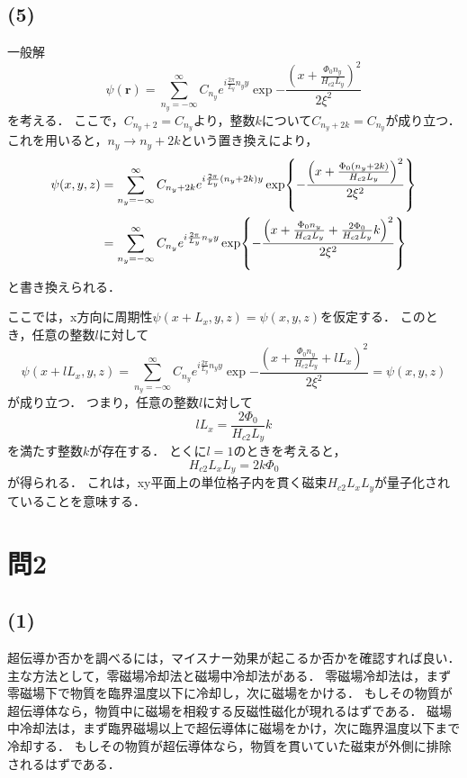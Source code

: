 \documentclass[a4paper,11pt]{jsarticle}
\begin{document}
\subsection*{(5)}
一般解
\begin{equation}
  \psi(\bm{r}) = \sum_{n_y=-\infty}^{\infty} C_{n_y} e^{i\frac{2\pi}{L_y}n_yy}\exp{-\frac{\left(x+\frac{\Phi_0n_y}{H_{c2}L_y}\right)^2}{2\xi^2}}
\end{equation}
を考える．
ここで，$C_{n_y+2}=C_{n_y}$より，整数$k$について$C_{n_y+2k}=C_{n_y}$が成り立つ．
これを用いると，$n_y\to n_y+2k$という置き換えにより，
\begin{align}
  \psi(x,y,z) 
  &= \sum_{n_y=-\infty}^{\infty} C_{n_y+2k} e^{i\frac{2\pi}{L_y}(n_y+2k)y}\exp{-\frac{\left(x+\frac{\Phi_0(n_y+2k)}{H_{c2}L_y}\right)^2}{2\xi^2}} \notag\\
  &= \sum_{n_y=-\infty}^{\infty} C_{n_y} e^{i\frac{2\pi}{L_y}n_yy}\exp{-\frac{\left(x+\frac{\Phi_0n_y}{H_{c2}L_y} + \frac{2\Phi_0}{H_{c2}L_y}k \right)^2}{2\xi^2}}
\end{align}
と書き換えられる．

ここでは，x方向に周期性$\psi(x+L_x,y,z) = \psi(x,y,z)$を仮定する．
このとき，任意の整数$l$に対して
\begin{equation}
  \psi(x+lL_x,y,z) = \sum_{n_y=-\infty}^{\infty} C_{n_y} e^{i\frac{2\pi}{L_y}n_yy}\exp{-\frac{\left(x+\frac{\Phi_0n_y}{H_{c2}L_y}+lL_x\right)^2}{2\xi^2}} = \psi(x,y,z)
\end{equation}
が成り立つ．
つまり，任意の整数$l$に対して
\begin{equation}
  lL_x = \frac{2\Phi_0}{H_{c2}L_y}k
\end{equation}
を満たす整数$k$が存在する．
とくに$l=1$のときを考えると，
\begin{equation}
  H_{c2}L_xL_y = 2k\Phi_0 
\end{equation}
が得られる．
これは，xy平面上の単位格子内を貫く磁束$H_{c2}L_xL_y$が量子化されていることを意味する．

\section*{問2}
\subsection*{(1)}
超伝導か否かを調べるには，マイスナー効果が起こるか否かを確認すれば良い．
主な方法として，零磁場冷却法と磁場中冷却法がある\cite{meissner}．
零磁場冷却法は，まず零磁場下で物質を臨界温度以下に冷却し，次に磁場をかける．
もしその物質が超伝導体なら，物質中に磁場を相殺する反磁性磁化が現れるはずである．
磁場中冷却法は，まず臨界磁場以上で超伝導体に磁場をかけ，次に臨界温度以下まで冷却する．
もしその物質が超伝導体なら，物質を貫いていた磁束が外側に排除されるはずである．
\end{document}

